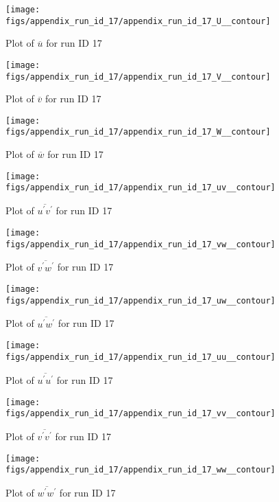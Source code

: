 \begin{figure}[H]
\centering
\texttt{[image: figs/appendix\_run\_id\_17/appendix\_run\_id\_17\_U\_\_contour]}
\caption{Plot of $\overline{u}$ for run ID 17}
\label{fig:appendix_run_id_17_U__contour}
\end{figure}


\begin{figure}[H]
\centering
\texttt{[image: figs/appendix\_run\_id\_17/appendix\_run\_id\_17\_V\_\_contour]}
\caption{Plot of $\overline{v}$ for run ID 17}
\label{fig:appendix_run_id_17_V__contour}
\end{figure}


\begin{figure}[H]
\centering
\texttt{[image: figs/appendix\_run\_id\_17/appendix\_run\_id\_17\_W\_\_contour]}
\caption{Plot of $\overline{w}$ for run ID 17}
\label{fig:appendix_run_id_17_W__contour}
\end{figure}


\begin{figure}[H]
\centering
\texttt{[image: figs/appendix\_run\_id\_17/appendix\_run\_id\_17\_uv\_\_contour]}
\caption{Plot of $\overline{u^\prime v^\prime}$ for run ID 17}
\label{fig:appendix_run_id_17_uv__contour}
\end{figure}


\begin{figure}[H]
\centering
\texttt{[image: figs/appendix\_run\_id\_17/appendix\_run\_id\_17\_vw\_\_contour]}
\caption{Plot of $\overline{v^\prime w^\prime}$ for run ID 17}
\label{fig:appendix_run_id_17_vw__contour}
\end{figure}


\begin{figure}[H]
\centering
\texttt{[image: figs/appendix\_run\_id\_17/appendix\_run\_id\_17\_uw\_\_contour]}
\caption{Plot of $\overline{u^\prime w^\prime}$ for run ID 17}
\label{fig:appendix_run_id_17_uw__contour}
\end{figure}


\begin{figure}[H]
\centering
\texttt{[image: figs/appendix\_run\_id\_17/appendix\_run\_id\_17\_uu\_\_contour]}
\caption{Plot of $\overline{u^\prime u^\prime}$ for run ID 17}
\label{fig:appendix_run_id_17_uu__contour}
\end{figure}


\begin{figure}[H]
\centering
\texttt{[image: figs/appendix\_run\_id\_17/appendix\_run\_id\_17\_vv\_\_contour]}
\caption{Plot of $\overline{v^\prime v^\prime}$ for run ID 17}
\label{fig:appendix_run_id_17_vv__contour}
\end{figure}


\begin{figure}[H]
\centering
\texttt{[image: figs/appendix\_run\_id\_17/appendix\_run\_id\_17\_ww\_\_contour]}
\caption{Plot of $\overline{w^\prime w^\prime}$ for run ID 17}
\label{fig:appendix_run_id_17_ww__contour}
\end{figure}


